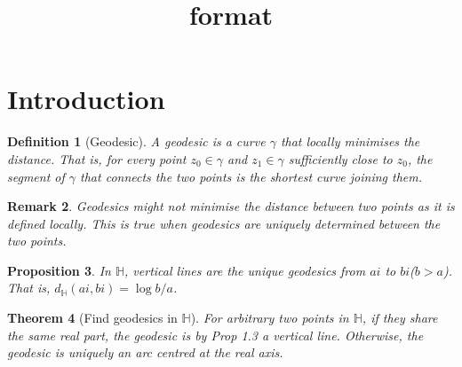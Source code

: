 \documentclass{article}
\title{format}
\author{}
\date{}
\begin{document}
\newtheorem{theorem}{Theorem}[section]
\newtheorem{lemma}[theorem]{Lemma}
\newtheorem{corollary}[theorem]{Corollary}
\newtheorem{proposition}[theorem]{Proposition}
\newtheorem{definition}[theorem]{Definition}
\newtheorem{remark}[theorem]{Remark}

\section{Introduction}

\begin{definition}[Geodesic]
    A geodesic is a curve $\gamma$ that locally minimises the distance. That is, for every point $z_0 \in \gamma$ and $z_1 \in \gamma$ sufficiently close to $z_0$, the segment of $\gamma$ that connects the two points is the shortest curve joining them.
\end{definition}

\begin{remark}
    Geodesics might not minimise the distance between two points as it is defined locally. This is true when geodesics are uniquely determined between the two points.
\end{remark}

\begin{proposition}
    In $\mathbb{H}$, vertical lines are the unique geodesics from $ai$ to $bi$($b>a$). That is, $d_{\mathbb{H}}(ai, bi) = \log{b/a}$.
\end{proposition}

\begin{theorem}[Find geodesics in $\mathbb{H}$]
    For arbitrary two points in $\mathbb{H}$, if they share the same real part, the geodesic is by Prop 1.3 a vertical line. Otherwise, the geodesic is uniquely an arc centred at the real axis.
\end{theorem}
\end{document}
